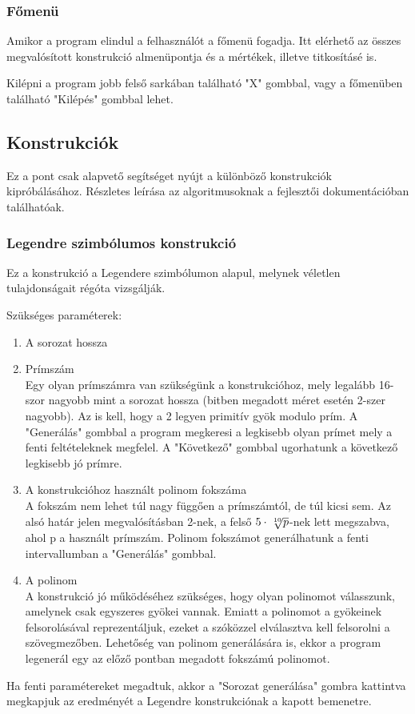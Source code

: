 \documentclass[12pt]{article}
\begin{document}
	\subsubsection{Főmenü}
	Amikor a program elindul a felhasználót a főmenü fogadja. Itt elérhető az összes megvalósított konstrukció almenüpontja és a mértékek, illetve titkosításé is.
	
	Kilépni a program jobb felső sarkában található "X" gombbal, vagy a főmenüben található "Kilépés" gombbal lehet.
	\subsection*{Konstrukciók}
	Ez a pont csak alapvető segítséget nyújt a különböző konstrukciók kipróbálásához. Részletes leírása az algoritmusoknak a fejlesztői dokumentációban találhatóak.
	\par
	\subsubsection{Legendre szimbólumos konstrukció}
	Ez a konstrukció a Legendere szimbólumon alapul, melynek véletlen tulajdonságait régóta vizsgálják.
	\par
	Szükséges paraméterek:
	\begin{enumerate}\bfseries
		\item A sorozat hossza
		\\ 
		\bfseries \item Prímszám
		\\ \normalfont Egy olyan prímszámra van szükségünk a konstrukcióhoz, mely legalább 16-szor nagyobb mint a sorozat hossza (bitben megadott méret esetén 2-szer nagyobb). Az is kell, hogy a 2 legyen primitív gyök modulo prím. A "Generálás" gombbal a program megkeresi a legkisebb olyan prímet mely a fenti feltételeknek megfelel. A "Következő" gombbal ugorhatunk a következő legkisebb jó prímre.
		\bfseries \item A konstrukcióhoz használt polinom fokszáma \\ \normalfont
		A fokszám nem lehet túl nagy függően a prímszámtól, de túl kicsi sem. Az alsó határ jelen megvalósításban 2-nek, a felső $5\cdot\sqrt[\leftroot{-2}\uproot{2}10]{p}$-nek lett megszabva, ahol p a használt prímszám. Polinom fokszámot generálhatunk a fenti intervallumban a "Generálás" gombbal.
		\bfseries \item A polinom \\
		\normalfont
		A konstrukció jó működéséhez szükséges, hogy olyan polinomot válasszunk, amelynek csak egyszeres gyökei vannak. Emiatt a polinomot a gyökeinek felsorolásával reprezentáljuk, ezeket a szóközzel elválasztva kell felsorolni a szövegmezőben. Lehetőség van polinom generálására is, ekkor a program legenerál egy az előző pontban megadott fokszámú polinomot.
	\end{enumerate}
	Ha fenti paramétereket megadtuk, akkor a "Sorozat generálása" gombra kattintva megkapjuk az eredményét a Legendre konstrukciónak a kapott bemenetre.
\end{document}
